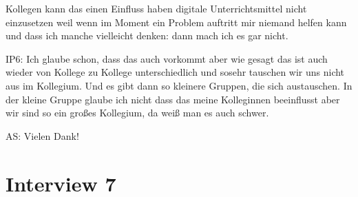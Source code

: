 \documentclass[fontsize=11pt,paper=a4]{scrbook}
\begin{document}
{\begin{itemize*}
Kollegen kann das einen Einfluss haben
digitale Unterrichtsmittel nicht einzusetzen weil wenn im Moment ein
Problem auftritt mir niemand helfen kann
und dass ich manche vielleicht denken:
dann mach ich es gar nicht.
\item[IP6:] Ich glaube schon, dass das auch vorkommt
aber wie gesagt das ist auch wieder von
Kollege zu Kollege unterschiedlich und
sosehr tauschen wir uns nicht aus im Kollegium. Und es gibt dann so kleinere Gruppen, die sich austauschen. In der kleine Gruppe glaube ich nicht dass das meine Kolleginnen beeinflusst aber wir
sind so ein großes Kollegium, da weiß man es auch schwer.
\item[AS:] Vielen Dank!
\end{itemize*} 
}

\section*{Interview 7} 
\end{document}
